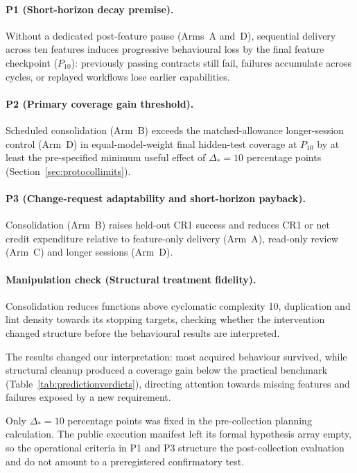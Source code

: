 \documentclass[11pt,a4paper]{article}
\begin{document}
\paragraph{P1 (Short-horizon decay premise).}
Without a dedicated
post-feature pause (Arms~A and~D), sequential delivery across ten features
induces progressive behavioural loss by the final feature checkpoint
($P_{10}$): previously passing contracts still fail, failures accumulate
across cycles, or replayed workflows lose earlier capabilities.

\paragraph{P2 (Primary coverage gain threshold).}
Scheduled consolidation (Arm~B) exceeds the matched-allowance longer-session control
(Arm~D) in equal-model-weight final hidden-test coverage at $P_{10}$ by at
least the pre-specified minimum useful effect of $\Delta_*=10$ percentage
points (Section~\ref{sec:protocollimits}).

\paragraph{P3 (Change-request adaptability and short-horizon payback).}
Consolidation (Arm~B) raises held-out CR1 success and reduces CR1 or net
credit expenditure relative to feature-only delivery (Arm~A), read-only
review (Arm~C) and longer sessions (Arm~D).

\paragraph{Manipulation check (Structural treatment fidelity).}
Consolidation reduces functions above cyclomatic complexity 10, duplication
and lint density towards its stopping targets, checking whether
the intervention changed structure before the behavioural
results are interpreted.

The results changed our interpretation: most acquired behaviour survived,
while structural cleanup produced a coverage gain below the practical
benchmark (Table~\ref{tab:predictionverdicts}), directing attention towards
missing features and failures exposed by a new requirement.

Only $\Delta_*=10$ percentage points was fixed in the pre-collection
planning calculation. The public execution manifest left its formal hypothesis
array empty, so the operational criteria in P1 and P3 structure the
post-collection evaluation and do not amount to a preregistered
confirmatory test.
\end{document}
